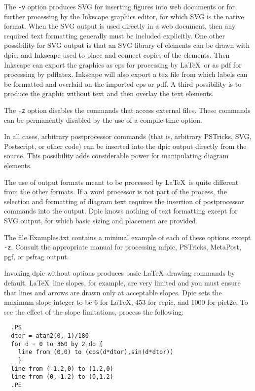 \documentclass[11pt]{article}
\newcommand{\bq}{}
\newcommand{\Dpic}{{\bq Dpic}\xspace}
\newcommand{\mfpic}{{\bq mfpic}\xspace}
\newcommand{\PSTricks}{{\bq PSTricks}\xspace}
\newcommand{\MetaPost}{{\bq MetaPost}\xspace}
\newcommand{\Postscript}{{\bq Postscript}\xspace}
\begin{document}
The {\tt -v} option produces SVG for inserting figures into web documents or for
further processing by the Inkscape graphics editor, for which SVG is the
native format.
When the SVG output is used directly in a web document,
then any required text formatting generally must be included explicitly.
One other possibility for SVG output is that an SVG library of elements
can be drawn with dpic, and Inkscape used to place and connect copies
of the elements.  Then Inkscape can export the graphics as eps for
processing by \LaTeX\ or as pdf for processing by pdflatex.  Inkscape
will also export a tex file from which labels can be formatted and
overlaid on the imported eps or pdf. A third possibility
is to produce the graphic without text and then overlay the text elements.

The {\tt -z} option disables the commands that access external files.
These commands can be permanently disabled by the use of a compile-time
option.

In all cases, arbitrary postprocessor commands (that is, arbitrary \PSTricks,
SVG, \Postscript, or other code) can be inserted into the dpic output
directly from the source.
This possibility adds considerable power for manipulating diagram
elements.

The use of output formats meant to be processed by \LaTeX\ is quite different
from the other formats.  If a word processor is not part of the process,
the selection and formatting of diagram text
requires the insertion of postprocessor commands into the output.
Dpic knows nothing of text formatting except for SVG output, for which
basic sizing and placement are provided.

The file Examples.txt contains a minimal example of each of these
options except {\tt -z}.  Consult the appropriate manual for processing
\mfpic, \PSTricks, \MetaPost, pgf, or psfrag output.

Invoking dpic without options produces basic \LaTeX\ drawing commands
by default.  \LaTeX\ line slopes, for example, are very limited and you
must ensure that lines and arrows are drawn only at acceptable slopes.
\Dpic sets the maximum slope integer to be 6 for \LaTeX, 453 for eepic,
and 1000 for pict2e.  To see the effect of the slope limitations,
process the following:
\begin{verbatim}
  .PS
  dtor = atan2(0,-1)/180
  for d = 0 to 360 by 2 do {
    line from (0,0) to (cos(d*dtor),sin(d*dtor))
    }
  line from (-1.2,0) to (1.2,0)
  line from (0,-1.2) to (0,1.2)
  .PE
\end{verbatim}
\end{document}
